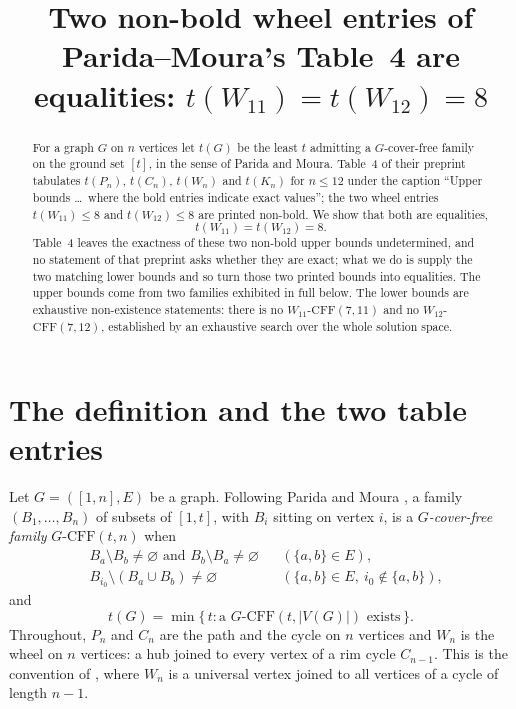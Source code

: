 \documentclass[11pt]{amsart}
\title[Two non-bold wheel entries are equalities]
{Two non-bold wheel entries of Parida--Moura's Table~4 are equalities:
 $t(W_{11})=t(W_{12})=8$}
\date{}
\newcommand{\CFF}{\mathrm{CFF}}
\begin{document}
\begin{abstract}
For a graph $G$ on $n$ vertices let $t(G)$ be the least $t$ admitting a
$G$-cover-free family on the ground set $[t]$, in the sense of Parida and
Moura. Table~4 of their preprint tabulates $t(P_n)$, $t(C_n)$, $t(W_n)$ and
$t(K_n)$ for $n\le 12$ under the caption ``Upper bounds \dots\ where the bold
entries indicate exact values''; the two wheel entries $t(W_{11})\le 8$ and
$t(W_{12})\le 8$ are printed non-bold. We show that both are equalities,
\[
 t(W_{11})=t(W_{12})=8 .
\]
Table~4 leaves the exactness of these two non-bold upper bounds undetermined,
and no statement of that preprint asks whether they are exact; what we do is
supply the two matching lower bounds and so turn those two printed bounds into
equalities. The upper bounds come
from two families exhibited in full below. The lower bounds are exhaustive
non-existence statements: there is no $W_{11}$-$\CFF(7,11)$ and no
$W_{12}$-$\CFF(7,12)$, established by an exhaustive search over the whole
solution space.
\end{abstract}

\maketitle

\section{The definition and the two table entries}

Let $G=([1,n],E)$ be a graph. Following Parida and Moura
\cite[Definitions 3.1 and 4.1]{PM}, a family
$(B_1,\dots,B_n)$ of subsets of
$[1,t]$, with $B_i$ sitting on vertex $i$, is a \emph{$G$-cover-free family}
$G$-$\CFF(t,n)$ when
\begin{align}
 &B_a\setminus B_b\neq\varnothing
   \text{ and } B_b\setminus B_a\neq\varnothing
   &&(\{a,b\}\in E), \label{eq:S}\\
 &B_{i_0}\setminus(B_a\cup B_b)\neq\varnothing
   &&(\{a,b\}\in E,\ i_0\notin\{a,b\}),
   \label{eq:CF}
\end{align}
and
\[
 t(G)=\min\{\,t : \text{a } G\text{-}\CFF(t,|V(G)|) \text{ exists}\,\}.
\]
Throughout, $P_n$ and $C_n$ are the path and the cycle on $n$ vertices and
$W_n$ is the wheel on $n$ vertices: a hub joined to every vertex of a rim cycle
$C_{n-1}$. This is the convention of \cite{PM}, where $W_n$ is a universal
vertex joined to all vertices of a cycle of length $n-1$.
\end{document}
